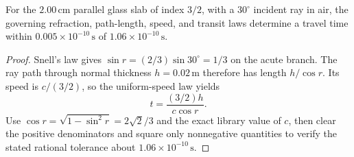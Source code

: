 \begin{theorem}
\label{thm:physics:phyx_mini_0003:target}
For the \(2.00\,\mathrm{cm}\) parallel glass slab of index \(3/2\), with a
\(30^\circ\) incident ray in air, the governing refraction, path-length,
speed, and transit laws determine a travel time within
\(0.005\times10^{-10}\,\mathrm s\) of \(1.06\times10^{-10}\,\mathrm s\).
\end{theorem}
\begin{proof}
Snell's law gives
\(\sin r=(2/3)\sin 30^\circ=1/3\) on the acute branch.  The ray path through
normal thickness \(h=0.02\,\mathrm m\) therefore has length \(h/\cos r\).
Its speed is \(c/(3/2)\), so the uniform-speed law yields
\[
 t=\frac{(3/2)h}{c\cos r}.
\]
Use \(\cos r=\sqrt{1-\sin^2r}=2\sqrt2/3\) and the exact library value of
\(c\), then clear the positive denominators and square only nonnegative
quantities to verify the stated rational tolerance about
\(1.06\times10^{-10}\,\mathrm s\).
\end{proof}

